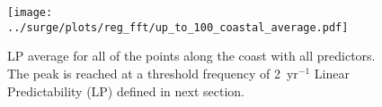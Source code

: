 
\begin{figure}
\centering
        \texttt{[image: ../surge/plots/reg\_fft/up\_to\_100\_coastal\_average.pdf]}
            \caption{LP average for all of the points along the coast with all predictors.
            The peak is reached at a threshold frequency of 2~yr$^{-1}$ Linear Predictability (LP) defined in next section.}
            \label{fig:lpredthresh}
\end{figure}
